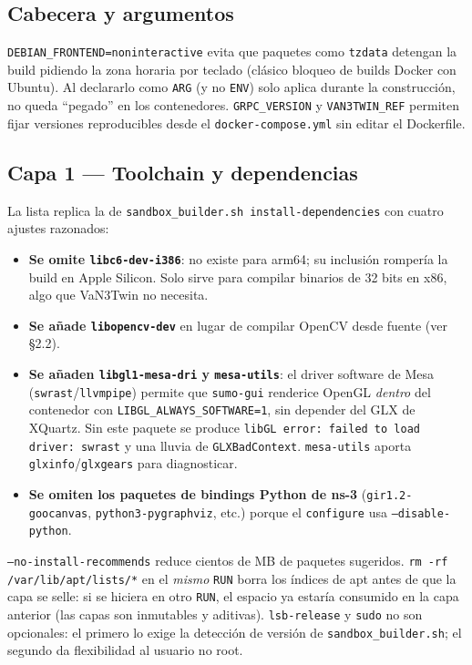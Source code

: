 \documentclass[11pt,a4paper]{article}
\begin{document}
\subsection{Cabecera y argumentos}

\begin{implicacion}
\texttt{DEBIAN\_FRONTEND=noninteractive} evita que paquetes como
\texttt{tzdata} detengan la build pidiendo la zona horaria por teclado
(cl\'asico bloqueo de builds Docker con Ubuntu). Al declararlo como
\texttt{ARG} (y no \texttt{ENV}) solo aplica durante la construcci\'on, no
queda ``pegado'' en los contenedores. \texttt{GRPC\_VERSION} y
\texttt{VAN3TWIN\_REF} permiten fijar versiones reproducibles desde el
\texttt{docker-compose.yml} sin editar el Dockerfile.
\end{implicacion}

\subsection{Capa 1 --- Toolchain y dependencias}

La lista replica la de \texttt{sandbox\_builder.sh install-dependencies} con
cuatro ajustes razonados:

\begin{itemize}
  \item \textbf{Se omite \texttt{libc6-dev-i386}}: no existe para arm64; su
  inclusi\'on romper\'ia la build en Apple Silicon. Solo sirve para compilar
  binarios de 32 bits en x86, algo que VaN3Twin no necesita.
  \item \textbf{Se a\~nade \texttt{libopencv-dev}} en lugar de compilar
  OpenCV desde fuente (ver \S2.2).
  \item \textbf{Se a\~naden \texttt{libgl1-mesa-dri} y \texttt{mesa-utils}}:
  el driver software de Mesa (\texttt{swrast}/\texttt{llvmpipe}) permite que
  \texttt{sumo-gui} renderice OpenGL \emph{dentro} del contenedor con
  \texttt{LIBGL\_ALWAYS\_SOFTWARE=1}, sin depender del GLX de XQuartz. Sin
  este paquete se produce \texttt{libGL error: failed to load driver: swrast}
  y una lluvia de \texttt{GLXBadContext}. \texttt{mesa-utils} aporta
  \texttt{glxinfo}/\texttt{glxgears} para diagnosticar.
  \item \textbf{Se omiten los paquetes de bindings Python de ns-3}
  (\texttt{gir1.2-goocanvas}, \texttt{python3-pygraphviz}, etc.) porque el
  \texttt{configure} usa \texttt{--disable-python}.
\end{itemize}

\begin{implicacion}
\texttt{--no-install-recommends} reduce cientos de MB de paquetes sugeridos.
\texttt{rm -rf /var/lib/apt/lists/*} en el \emph{mismo} \texttt{RUN} borra los
\'indices de apt antes de que la capa se selle: si se hiciera en otro
\texttt{RUN}, el espacio ya estar\'ia consumido en la capa anterior (las capas
son inmutables y aditivas). \texttt{lsb-release} y \texttt{sudo} no son
opcionales: el primero lo exige la detecci\'on de versi\'on de
\texttt{sandbox\_builder.sh}; el segundo da flexibilidad al usuario no root.
\end{implicacion}
\end{document}
